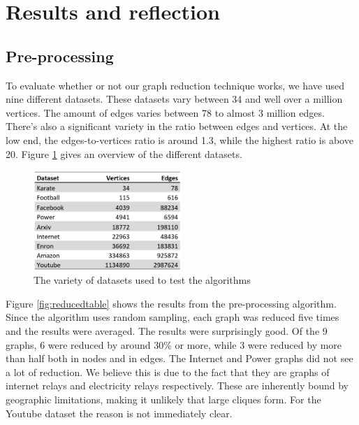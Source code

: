 \section{Results and reflection}
\label{chapter:results}
\subsection{Pre-processing}
To evaluate whether or not our graph reduction technique works, we have used nine different datasets. These datasets vary between 34 and well over a million vertices. The amount of edges varies between 78 to almost 3 million edges. There's also a significant variety in the ratio between edges and vertices. At the low end, the edges-to-vertices ratio is around 1.3, while the highest ratio is above 20. Figure \ref{fig:datasets} gives an overview of the different datasets.

\begin{figure}[H]
\begin{center}
\includegraphics[width=0.5\textwidth]{images/datasets.png}
\caption{The variety of datasets used to test the algorithms}\label{fig:datasets}
\end{center}
\end{figure}

Figure \ref{fig:reducedtable} shows the results from the pre-processing algorithm. Since the algorithm uses random sampling, each graph was reduced five times and the results were averaged. The results were surprisingly good. Of the 9 graphs, 6 were reduced by around 30\% or more, while 3 were reduced by more than half both in nodes and in edges. The Internet and Power graphs did not see a lot of reduction. We believe this is due to the fact that they are graphs of internet relays and electricity relays respectively. These are inherently bound by geographic limitations, making it unlikely that large cliques form. For the Youtube dataset the reason is not immediately clear.

